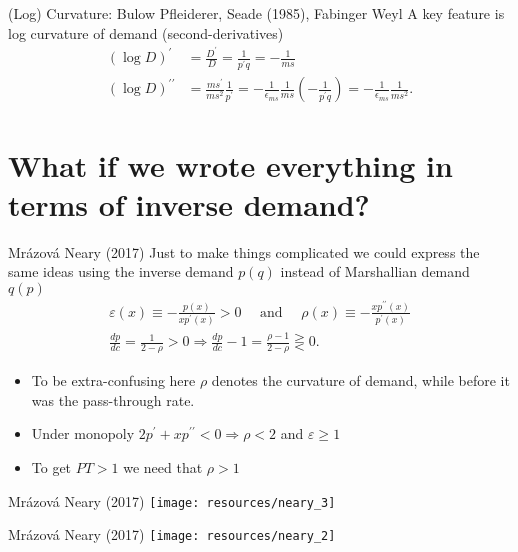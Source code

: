 \begin{frame}{(Log) Curvature: Bulow Pfleiderer, Seade (1985), Fabinger Weyl}
A key feature is \alert{log curvature} of demand (second-derivatives)
\begin{align*}
(\log D)^{\prime}&=\frac{D^{\prime}}{D}=\frac{1}{p^{\prime} q}=-\frac{1}{m s}\\
(\log D)^{\prime \prime}&=\frac{m s^{\prime}}{m s^2} \frac{1}{p^{\prime}}=-\frac{1}{\epsilon_{m s}} \frac{1}{m s}\left(-\frac{1}{p^{\prime} q}\right)=-\frac{1}{\epsilon_{m s}} \frac{1}{m s^2}.
\end{align*}
\end{frame}


\section*{What if we wrote everything in terms of inverse demand?}

\begin{frame}{Mrázová Neary (2017)}
Just to make things complicated we could express the same ideas using the \alert{inverse demand} $p(q)$ instead of \alert{Marshallian demand} $q(p)$
\begin{align*}
\varepsilon(x) \equiv-\frac{p(x)}{x p^{\prime}(x)}>0 \quad \text { and } \quad \rho(x) \equiv-\frac{x p^{\prime \prime}(x)}{p^{\prime}(x)}\\
\frac{d p}{d c}=\frac{1}{2-\rho}>0 \Rightarrow \frac{d p}{d c}-1=\frac{\rho-1}{2-\rho} \gtreqless 0 .
\end{align*}
\begin{itemize}
    \item To be extra-confusing here $\rho$ denotes the curvature of demand, while before it was the pass-through rate.
    \item Under monopoly $2 p^{\prime}+x p^{\prime \prime}<0 \Rightarrow \rho<2$ and $\varepsilon \geq 1$
    \item To get $PT > 1$ we need that $\rho > 1$
\end{itemize}
\end{frame}



\begin{frame}{Mrázová Neary (2017)}
\texttt{[image: resources/neary\_3]}
\end{frame}


\begin{frame}{Mrázová Neary (2017)}
\texttt{[image: resources/neary\_2]}
\end{frame}



